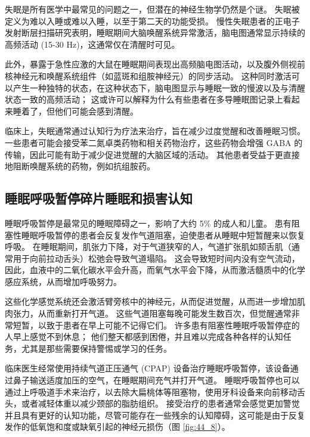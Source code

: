 失眠是所有医学中最常见的问题之一，但潜在的神经生物学仍然是个谜。
失眠被定义为难以入睡或难以入睡，以至于第二天的功能受损。
慢性失眠患者的正电子发射断层扫描研究表明，睡眠期间大脑唤醒系统异常激活，脑电图通常显示持续的高频活动 (15-30 Hz)，这通常仅在清醒时可见。


此外，暴露于急性应激的大鼠在睡眠期间表现出高频脑电图活动，以及腹外侧视前核神经元和唤醒系统组件（如蓝斑和组胺神经元）的同步活动。
这种同时激活可以产生一种独特的状态，在这种状态下，脑电图显示与睡眠一致的慢波以及与清醒状态一致的高频活动；
这或许可以解释为什么有些患者在多导睡眠图记录上看起来睡着了，但他们可能会感到清醒。


临床上，失眠通常通过认知行为疗法来治疗，旨在减少过度觉醒和改善睡眠习惯。
一些患者可能会接受苯二氮卓类药物和相关药物治疗，这些药物会增强 GABA 的传输，因此可能有助于减少促进觉醒的大脑区域的活动。
其他患者受益于更直接地阻断唤醒系统的药物，例如抗组胺药。



\subsection{睡眠呼吸暂停碎片睡眠和损害认知}

睡眠呼吸暂停是最常见的睡眠障碍之一，影响了大约 5\% 的成人和儿童。
患有阻塞性睡眠呼吸暂停的患者会反复发作气道阻塞，迫使患者从睡眠中短暂醒来以恢复呼吸。
在睡眠期间，肌张力下降，对于气道狭窄的人，气道扩张肌如颏舌肌（通常用于向前拉动舌头）松弛会导致气道塌陷。
这会导致短时间内没有空气流动，因此，血液中的二氧化碳水平会升高，而氧气水平会下降，从而激活髓质中的化学感应系统，从而增加呼吸努力。


这些化学感觉系统还会激活臂旁核中的神经元，从而促进觉醒，从而进一步增加肌肉张力，从而重新打开气道。
这些气道阻塞每晚可能发生数百次，但觉醒通常非常短暂，以致于患者在早上可能不记得它们。
许多患有阻塞性睡眠呼吸暂停症的人早上感觉不到休息；
他们整天都感到困倦，并且难以完成各种各样的认知任务，尤其是那些需要保持警惕或学习的任务。


临床医生经常使用持续气道正压通气 (CPAP) 设备治疗睡眠呼吸暂停，该设备通过鼻子输送适度加压的空气，在睡眠期间充气并打开气道。
睡眠呼吸暂停也可以通过上呼吸道手术来治疗，以去除大扁桃体等阻塞物，使用牙科设备来向前移动舌头，或者减轻体重以减少颈部的脂肪组织。
接受治疗的患者通常会感觉更加警觉并且具有更好的认知功能，尽管可能存在一些残余的认知障碍，这可能是由于反复发作的低氧饱和度或缺氧引起的神经元损伤（图 \ref{fig:44_8}）。



